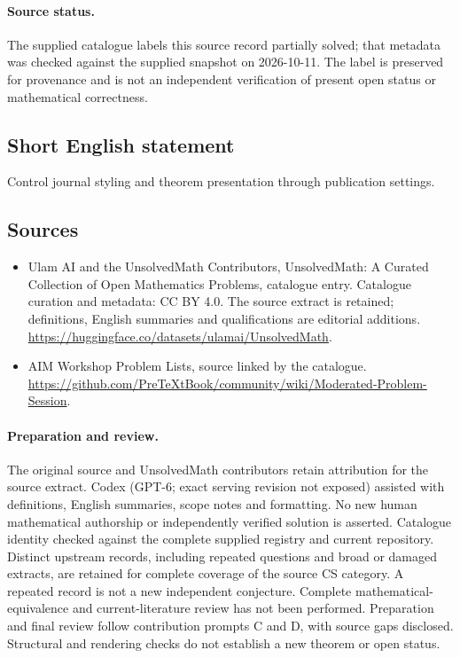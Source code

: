 \documentclass[11pt]{article}
\begin{document}
\paragraph{Source status.}
The supplied catalogue labels this source record partially solved; that metadata was checked against the supplied snapshot on 2026-10-11. The label is preserved for provenance and is not an independent verification of present open status or mathematical correctness.
\subsection{Short English statement}
Control journal styling and theorem presentation through publication settings.
\subsection{Sources}
\begin{itemize}
\item[\hypertarget{source:statement:1}{S1}] Ulam AI and the UnsolvedMath Contributors, UnsolvedMath: A Curated Collection of Open Mathematics Problems, catalogue entry. Catalogue curation and metadata: CC BY 4.0. The source extract is retained; definitions, English summaries and qualifications are editorial additions.
\url{https://huggingface.co/datasets/ulamai/UnsolvedMath}.
\item[\hypertarget{source:statement:2}{S2}] AIM Workshop Problem Lists, source linked by the catalogue.
\url{https://github.com/PreTeXtBook/community/wiki/Moderated-Problem-Session}.
\end{itemize}
\paragraph{Preparation and review.}
The original source and UnsolvedMath contributors retain attribution for the source extract. Codex (GPT-6; exact serving revision not exposed) assisted with definitions, English summaries, scope notes and formatting. No new human mathematical authorship or independently verified solution is asserted. Catalogue identity checked against the complete supplied registry and current repository. Distinct upstream records, including repeated questions and broad or damaged extracts, are retained for complete coverage of the source CS category. A repeated record is not a new independent conjecture. Complete mathematical-equivalence and current-literature review has not been performed. Preparation and final review follow contribution prompts C and D, with source gaps disclosed. Structural and rendering checks do not establish a new theorem or open status.
\label{end:statement}
\end{document}
